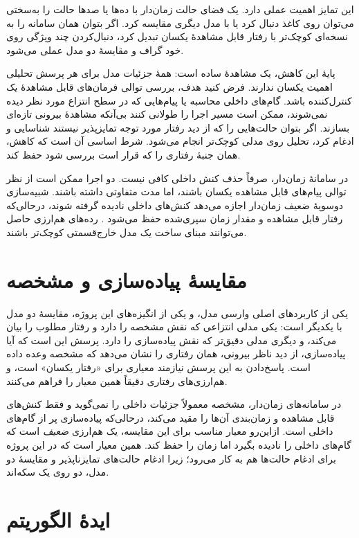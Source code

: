 این تمایز اهمیت عملی دارد. یک فضای حالت زمان‌دار با ده‌ها یا صدها حالت را به‌سختی می‌توان روی کاغذ دنبال کرد یا با مدل دیگری مقایسه کرد. اگر بتوان همان سامانه را به نسخه‌ای کوچک‌تر با رفتار قابل مشاهدهٔ یکسان تبدیل کرد، دنبال‌کردن چند ویژگی روی خود گراف و مقایسهٔ دو مدل عملی می‌شود.

پایهٔ این کاهش، یک مشاهدهٔ ساده است: همهٔ جزئیات مدل برای هر پرسش تحلیلی اهمیت یکسان ندارند. فرض کنید هدف، بررسی توالی فرمان‌های قابل مشاهدهٔ یک کنترل‌کننده باشد. گام‌های داخلی محاسبه یا پیام‌هایی که در سطح انتزاع مورد نظر دیده نمی‌شوند، ممکن است مسیر اجرا را طولانی کنند بی‌آنکه مشاهدهٔ بیرونی تازه‌ای بسازند. اگر بتوان حالت‌هایی را که از دید رفتار مورد توجه تمایزپذیر نیستند شناسایی و ادغام کرد، تحلیل روی مدلی کوچک‌تر انجام می‌شود. شرط اساسی آن است که کاهش، همان جنبهٔ رفتاری را که قرار است بررسی شود حفظ کند.

در سامانهٔ زمان‌دار، صرفاً حذف کنش داخلی کافی نیست. دو اجرا ممکن است از نظر توالی پیام‌های قابل مشاهده یکسان باشند، اما مدت متفاوتی داشته باشند. شبیه‌سازی دوسویهٔ ضعیف زمان‌دار اجازه می‌دهد کنش‌های داخلی نادیده گرفته شوند، درحالی‌که رفتار قابل مشاهده و مقدار زمان سپری‌شده حفظ می‌شود \cite{BerardEtAl2008,ReynierSangnier2009}. رده‌های هم‌ارزی حاصل می‌توانند مبنای ساخت یک مدل خارج‌قسمتی کوچک‌تر باشند.

\section{مقایسهٔ پیاده‌سازی و مشخصه}

یکی از کاربردهای اصلی وارسی مدل، و یکی از انگیزه‌های این پروژه، مقایسهٔ دو مدل با یکدیگر است: یکی مدلی انتزاعی که نقش مشخصه را دارد و رفتار مطلوب را بیان می‌کند، و دیگری مدلی دقیق‌تر که نقش پیاده‌سازی را دارد. پرسش این است که آیا پیاده‌سازی، از دید ناظر بیرونی، همان رفتاری را نشان می‌دهد که مشخصه وعده داده است. پاسخ‌دادن به این پرسش نیازمند معیاری برای «رفتار یکسان» است، و هم‌ارزی‌های رفتاری دقیقاً همین معیار را فراهم می‌کنند.

در سامانه‌های زمان‌دار، مشخصه معمولاً جزئیات داخلی را نمی‌گوید و فقط کنش‌های قابل مشاهده و زمان‌بندی آن‌ها را مقید می‌کند، درحالی‌که پیاده‌سازی پر از گام‌های داخلی است. ازاین‌رو معیار مناسب برای این مقایسه، یک هم‌ارزی \emph{ضعیف} است که گام‌های داخلی را نادیده بگیرد اما زمان را حفظ کند. همین معیار است که در این پروژه برای ادغام حالت‌ها هم به کار می‌رود؛ زیرا ادغام حالت‌های تمایزناپذیر و مقایسهٔ دو مدل، دو روی یک سکه‌اند.

\section{ایدهٔ الگوریتم}

